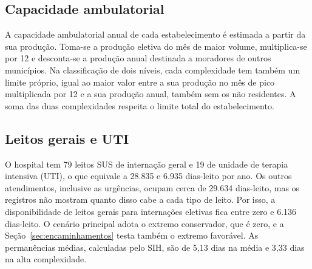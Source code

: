 \documentclass[12pt,a4paper,oneside]{report}
\begin{document}
\subsection{Capacidade ambulatorial}
A capacidade ambulatorial anual de cada estabelecimento é estimada a partir da sua produção. Toma-se a
produção eletiva do mês de maior volume, multiplica-se por 12 e desconta-se a produção anual destinada a
moradores de outros municípios. Na classificação de dois níveis, cada complexidade tem também um limite
próprio, igual ao maior valor entre a sua produção no mês de pico multiplicada por 12 e a sua produção
anual, também sem os não residentes. A soma das duas complexidades respeita o limite total do
estabelecimento.

\subsection{Leitos gerais e UTI}\label{sec:leitos}
O hospital tem 79 leitos SUS de internação geral e 19 de unidade de terapia intensiva (UTI), o que
equivale a 28.835 e 6.935 dias-leito por ano. Os outros atendimentos, inclusive as urgências, ocupam
cerca de 29.634 dias-leito, mas os registros não mostram quanto disso cabe a cada tipo de leito. Por
isso, a disponibilidade de leitos gerais para internações eletivas fica entre zero e 6.136 dias-leito.
O cenário principal adota o extremo conservador, que é zero, e a Seção~\ref{sec:encaminhamentos} testa
também o extremo favorável. As permanências médias, calculadas pelo SIH, são de 5,13 dias na média e
3,33 dias na alta complexidade.
\end{document}
